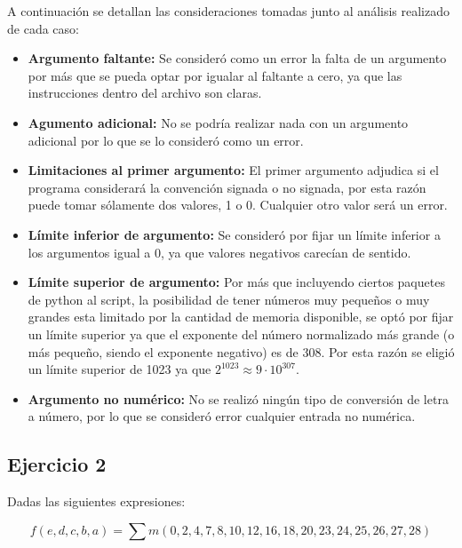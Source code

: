 \documentclass[a4paper]{article}
\begin{document}
A continuación se detallan las consideraciones tomadas junto al análisis realizado de cada caso:
\begin{itemize}
\item \textbf{Argumento faltante:} Se consideró como un error la falta de un argumento por más que se pueda optar por igualar al faltante a cero, ya que las instrucciones dentro del archivo son claras.
\item \textbf{Agumento adicional:} No se podría realizar nada con un argumento adicional por lo que se lo consideró como un error.
\item \textbf{Limitaciones al primer argumento:} El primer argumento adjudica si el programa considerará la convención signada o no signada, por esta razón puede tomar sólamente dos valores, 1 o 0. Cualquier otro valor será un error.
\item \textbf{Límite inferior de argumento:} Se consideró por fijar un límite inferior a los argumentos igual a 0, ya que valores negativos carecían de sentido.
\item \textbf{Límite superior de argumento:} Por más que incluyendo ciertos paquetes de python al script, la posibilidad de tener números muy pequeños o muy grandes esta limitado por la cantidad de memoria disponible, se optó por fijar un límite superior ya que el exponente del número normalizado más grande (o más pequeño, siendo el exponente negativo) es de 308. Por esta razón se eligió un límite superior de 1023 ya que $2^{1023} \approx 9\cdot 10^{307}$.
\item \textbf{Argumento no numérico:} No se realizó ningún tipo de conversión de letra a número, por lo que se consideró error cualquier entrada no numérica.

\end{itemize}

\subsection*{Ejercicio 2}

Dadas las siguientes expresiones:

\begin{equation}
f \left( e,d,c,b,a \right) = \sum m \left( 0,2,4,7,8,10,12,16,18,20,23,24,25,26,27,28 \right)
\label{equ:minterms}
\end{equation}
\end{document}
